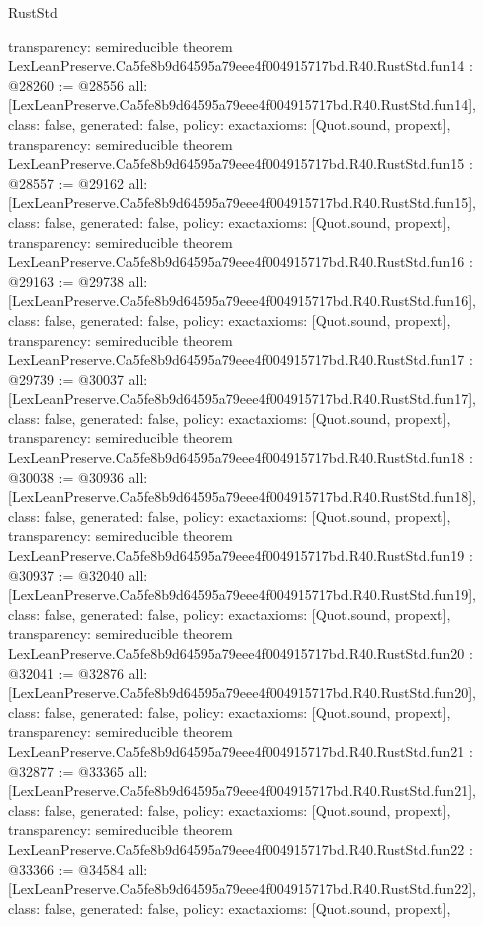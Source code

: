 \begin{lexlean}{RustStd}
\begin{coremodule}
{  transparency: semireducible
}
theorem LexLeanPreserve.Ca5fe8b9d64595a79eee4f004915717bd.R40.RustStd.fun14 : @28260 := @28556 {
  all: [LexLeanPreserve.Ca5fe8b9d64595a79eee4f004915717bd.R40.RustStd.fun14],
  class: false,
  generated: false,
  policy: exact{axioms: [Quot.sound, propext]},
  transparency: semireducible
}
theorem LexLeanPreserve.Ca5fe8b9d64595a79eee4f004915717bd.R40.RustStd.fun15 : @28557 := @29162 {
  all: [LexLeanPreserve.Ca5fe8b9d64595a79eee4f004915717bd.R40.RustStd.fun15],
  class: false,
  generated: false,
  policy: exact{axioms: [Quot.sound, propext]},
  transparency: semireducible
}
theorem LexLeanPreserve.Ca5fe8b9d64595a79eee4f004915717bd.R40.RustStd.fun16 : @29163 := @29738 {
  all: [LexLeanPreserve.Ca5fe8b9d64595a79eee4f004915717bd.R40.RustStd.fun16],
  class: false,
  generated: false,
  policy: exact{axioms: [Quot.sound, propext]},
  transparency: semireducible
}
theorem LexLeanPreserve.Ca5fe8b9d64595a79eee4f004915717bd.R40.RustStd.fun17 : @29739 := @30037 {
  all: [LexLeanPreserve.Ca5fe8b9d64595a79eee4f004915717bd.R40.RustStd.fun17],
  class: false,
  generated: false,
  policy: exact{axioms: [Quot.sound, propext]},
  transparency: semireducible
}
theorem LexLeanPreserve.Ca5fe8b9d64595a79eee4f004915717bd.R40.RustStd.fun18 : @30038 := @30936 {
  all: [LexLeanPreserve.Ca5fe8b9d64595a79eee4f004915717bd.R40.RustStd.fun18],
  class: false,
  generated: false,
  policy: exact{axioms: [Quot.sound, propext]},
  transparency: semireducible
}
theorem LexLeanPreserve.Ca5fe8b9d64595a79eee4f004915717bd.R40.RustStd.fun19 : @30937 := @32040 {
  all: [LexLeanPreserve.Ca5fe8b9d64595a79eee4f004915717bd.R40.RustStd.fun19],
  class: false,
  generated: false,
  policy: exact{axioms: [Quot.sound, propext]},
  transparency: semireducible
}
theorem LexLeanPreserve.Ca5fe8b9d64595a79eee4f004915717bd.R40.RustStd.fun20 : @32041 := @32876 {
  all: [LexLeanPreserve.Ca5fe8b9d64595a79eee4f004915717bd.R40.RustStd.fun20],
  class: false,
  generated: false,
  policy: exact{axioms: [Quot.sound, propext]},
  transparency: semireducible
}
theorem LexLeanPreserve.Ca5fe8b9d64595a79eee4f004915717bd.R40.RustStd.fun21 : @32877 := @33365 {
  all: [LexLeanPreserve.Ca5fe8b9d64595a79eee4f004915717bd.R40.RustStd.fun21],
  class: false,
  generated: false,
  policy: exact{axioms: [Quot.sound, propext]},
  transparency: semireducible
}
theorem LexLeanPreserve.Ca5fe8b9d64595a79eee4f004915717bd.R40.RustStd.fun22 : @33366 := @34584 {
  all: [LexLeanPreserve.Ca5fe8b9d64595a79eee4f004915717bd.R40.RustStd.fun22],
  class: false,
  generated: false,
  policy: exact{axioms: [Quot.sound, propext]},
}
\end{coremodule}
\end{lexlean}
